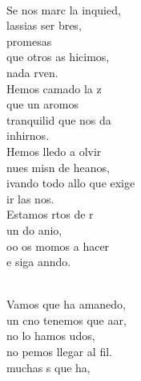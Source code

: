 \documentclass[12pt]{article}
\begin{document}
\begin{multicols*}{2}
\begin{cancion}%
	       \chord{(}{**)}{    }\\
	Se nos marc la inquied, \\
	lassias  ser bres,\\
	promesas\\
	que otros as hicimos,\\
	 nada rven.\\
	Hemos camado la z\\
	que un aromos\\
	  tranquilid que nos da\\
	 inhirnos.\\
	Hemos lledo a olvir\\
	nues misn de heanos, \\
	ivando todo allo que exige\\
	ir las nos.\\
	Estamos rtos de r\\
	un do anio,\\
	oo os momos a hacer\\
	e siga anndo.\\\jump\\
	\begin{chorus}%
	Vamos que  ha amanedo,\\
	un cno tenemos que aar,\\
	no lo hamos udos,\\
	no pemos llegar al fil.\\
	 muchas s que ha,\\

\end{chorus}
\end{cancion}
\end{multicols*}
\end{document}
